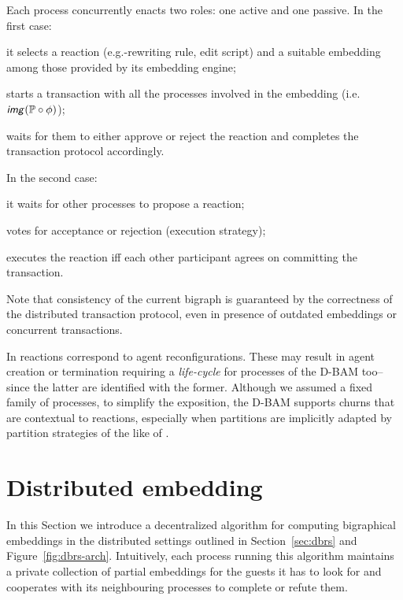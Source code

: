 \documentclass[a4paper,english,10pt]{article}
\theoremstyle{plain}\newtheorem{theorem}{Theorem}
\theoremstyle{plain}\newtheorem{corollary}[theorem]{Corollary}
\theoremstyle{plain}\newtheorem{proposition}[theorem]{Proposition}
\theoremstyle{plain}\newtheorem{lemma}[theorem]{Lemma}
\theoremstyle{plain}\newtheorem{definition}{Definition}
\theoremstyle{plain}\newtheorem{remark}{Remark}
\theoremstyle{plain}\newtheorem{example}[remark]{Example}
\newcommand{\?}[1]{}
\newcommand{\rng}{\textsf{\textit{img}}}
\newcommand{\mbb}[1]{\mathbb{#1}}
\newcommand{\prt}{\mbb}
\begin{document}
Each process concurrently enacts two roles: one active and one passive.
In the first case:
\begin{enumerate*}[label=\em(1\alph{*})]
	\item 
		it selects a reaction 
		(e.g.-rewriting rule, edit script) and 
		a suitable embedding among those provided by
		its embedding engine;
	\item
		starts a transaction with all the processes
		involved in the embedding (i.e.~$\rng(\prt P \circ \phi)$);
	\item
		waits for them to either approve or reject the reaction and 
		completes the transaction protocol accordingly.
\end{enumerate*}
In the second case:
\begin{enumerate*}[label=\em(2\alph{*})]
	\item 
		it waits for other processes to propose a reaction;
	\item
		votes for acceptance or rejection (execution strategy);
	\item
		executes the reaction iff each other participant 
		agrees on committing the transaction.
\end{enumerate*}
Note that consistency of the current bigraph is guaranteed by the correctness of the
distributed transaction protocol, even in presence of outdated
embeddings or concurrent transactions.

In \cite{mmp:dais14} reactions correspond to agent reconfigurations.
These may result in agent creation or termination requiring a 
\emph{life-cycle} for processes of the D-BAM too--since the latter are
identified with the former. Although we assumed a fixed
family of processes, to simplify the exposition, the D-BAM 
supports churns that are contextual to reactions,
especially when partitions are implicitly adapted by partition
strategies of the like of \cite{mmp:dais14}.


\section{Distributed embedding}
\label{sec:demb}
In this Section we introduce a decentralized algorithm for computing bigraphical embeddings
in the distributed settings outlined in Section~\ref{sec:dbrs}
and Figure~\ref{fig:dbrs-arch}.
Intuitively, each process running this algorithm maintains a 
private collection of partial embeddings for the guests it has to look
for and cooperates with its neighbouring processes to complete 
or refute them. 
\end{document}
